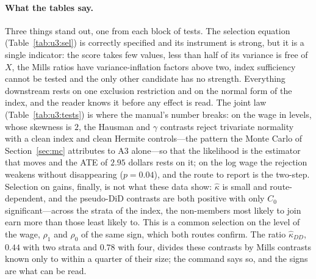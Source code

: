 \documentclass[11pt,a4paper]{article}
\theoremstyle{plain}
\theoremstyle{definition}
\theoremstyle{remark}
\newcommand{\1}{\mathbf{1}}
\begin{document}
\paragraph{What the tables say.}
Three things stand out, one from each block of tests. The selection
equation (Table~\ref{tab:u3:sel}) is correctly specified and its
instrument is strong, but it is a single indicator: the score takes
few values, less than half of its variance is free of $X$, the Mills
ratios have variance-inflation factors above two, index sufficiency
cannot be tested and the only other candidate has no strength.
Everything downstream rests on one exclusion restriction and on the
normal form of the index, and the reader knows it before any effect is
read. The joint law (Table~\ref{tab:u3:tests}) is where the manual's
number breaks: on the wage in levels, whose skewness is $2$, the
Hausman and $\gamma$ contrasts reject trivariate normality with a clean
index and clean Hermite controls---the pattern the Monte Carlo of
Section~\ref{sec:mc} attributes to A3 alone---so that the likelihood is
the estimator that moves and the ATE of $2.95$ dollars rests on it; on
the log wage the rejection weakens without disappearing ($p=0.04$),
and the route to report is the two-step. Selection on gains, finally,
is not what these data show: $\hat\kappa$ is small and route-dependent,
and the pseudo-DiD contrasts are both positive with only $C_0$
significant---across the strata of the index, the non-members most
likely to join earn more than those least likely to. This is a common
selection on the level of the wage, $\rho_1$ and $\rho_0$ of the same
sign, which both routes confirm. The ratio $\hat\kappa_{DD}$, $0.44$ with
two strata and $0.78$ with four, divides these contrasts by Mills
contrasts known only to within a quarter of their size; the command says
so, and the signs are what can be read.
\end{document}
